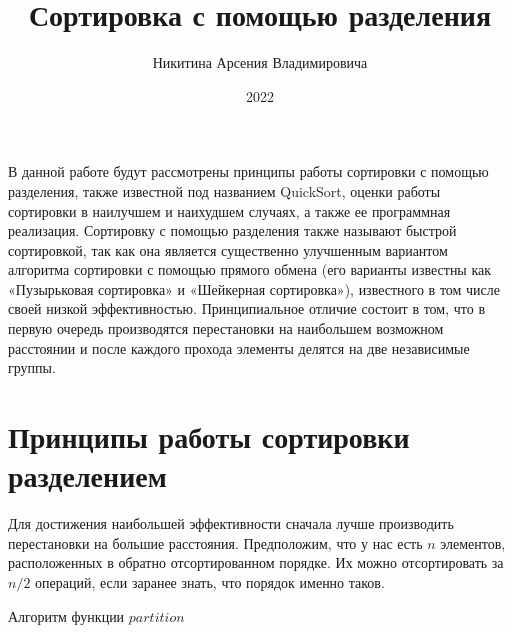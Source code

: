 \documentclass[bachelor, och, labwork]{shiza}
\begin{document}

\title{Сортировка с помощью разделения}





\author{Никитина Арсения Владимировича}



\date{2022}

\maketitle

\tableofcontents

\intro
В данной работе будут рассмотрены принципы работы сортировки с помощью 
разделения, также известной под названием QuickSort, оценки работы сортировки в 
наилучшем и наихудшем случаях, а также ее программная реализация.
Сортировку с помощью разделения также называют быстрой сортировкой, так как она
является существенно улучшенным вариантом алгоритма сортировки с помощью 
прямого обмена (его варианты известны как «Пузырьковая сортировка» и «Шейкерная 
сортировка»), известного в том числе своей низкой эффективностью. Принципиальное 
отличие состоит в том, что в первую очередь производятся перестановки на 
наибольшем возможном расстоянии и после каждого прохода элементы делятся на две 
независимые группы.

\section{Принципы работы сортировки разделением}

Для достижения наибольшей эффективности сначала лучше производить перестановки
на большие расстояния. Предположим, что у нас есть $n$ элементов, расположенных
в обратно отсортированном порядке. Их можно отсортировать за $n/2$ операций,
если заранее знать, что порядок именно таков.

\begin{center}Алгоритм функции $partition$\end{center}
\end{document}
